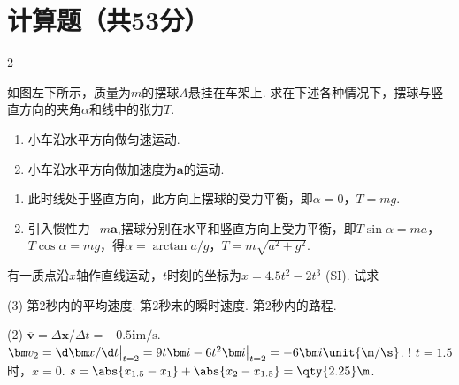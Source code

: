 \section{计算题（共53分）}

\begin{paracol}{2}
\begin{problem} %
    如图左下所示，质量为$m$的摆球$A$悬挂在车架上. 求在下述各种情况下，摆球与竖直方向的夹角$\alpha$和线中的张力$T$.
    \begin{enumerate}
        \item 小车沿水平方向做匀速运动.
        \item 小车沿水平方向做加速度为$\bm a$的运动.
    \end{enumerate}
    \switchcolumn\vspace*{\fill}\centering
    \vspace*{\fill}
\end{problem}
\end{paracol}
\begin{solution}\leavevmode
    \begin{enumerate}
        \item 此时线处于竖直方向，此方向上摆球的受力平衡，即$\alpha=0$，$T=mg$.
        \item 引入惯性力$-m\bm a$,摆球分别在水平和竖直方向上受力平衡，即$T\sin\alpha=ma$，$T\cos\alpha=mg$，得$\alpha=\arctan{a/g}$，$T=m\sqrt{a^2+g^2}$.
    \end{enumerate}
\end{solution}

\begin{problem}
    有一质点沿$x$轴作直线运动，$t$时刻的坐标为$x=4.5t^2-2t^3$ (SI). 试求
    \begin{tasks}[label=\arabic*.](3)
        \task 第$2$秒内的平均速度.
        \task 第$2$秒末的瞬时速度.
        \task 第$2$秒内的路程.
    \end{tasks}
\end{problem}
\begin{solution}\leavevmode
    \begin{tasks}[label=\arabic*.](2)
        \task $\bm{\overline v}=\Delta\bm x/\Delta t=-0.5\bm i\unit{\m/\s}$.
        \task $\bm v_2=\d\bm x/\d t\big|_{t=2}=9t\bm i-6t^2\bm i\big|_{t=2}=-6\bm i\unit{\m/\s}$.
        \task! $t=1.5$时，$x=0$. $s=\abs{x_{1.5}-x_1}+\abs{x_2-x_{1.5}}=\qty{2.25}\m$.
    \end{tasks}
\end{solution}

